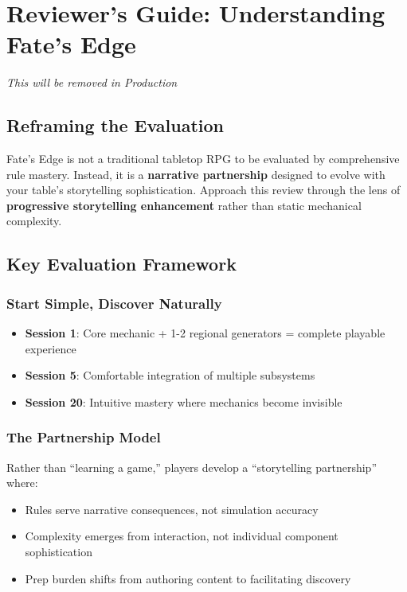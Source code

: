 \section{Reviewer's Guide: Understanding Fate's Edge}

\textit{This will be removed in Production}

\subsection{Reframing the Evaluation}

Fate's Edge is not a traditional tabletop RPG to be evaluated by comprehensive rule mastery. Instead, it is a \textbf{narrative partnership} designed to evolve with your table's storytelling sophistication. Approach this review through the lens of \textbf{progressive storytelling enhancement} rather than static mechanical complexity.

\subsection{Key Evaluation Framework}

\subsubsection{Start Simple, Discover Naturally}
\begin{itemize}
    \item \textbf{Session 1}: Core mechanic + 1-2 regional generators = complete playable experience
    \item \textbf{Session 5}: Comfortable integration of multiple subsystems
    \item \textbf{Session 20}: Intuitive mastery where mechanics become invisible
\end{itemize}

\subsubsection{The Partnership Model}
Rather than ``learning a game,'' players develop a ``storytelling partnership'' where:
\begin{itemize}
    \item Rules serve narrative consequences, not simulation accuracy
    \item Complexity emerges from interaction, not individual component sophistication  
    \item Prep burden shifts from authoring content to facilitating discovery
\end{itemize}

